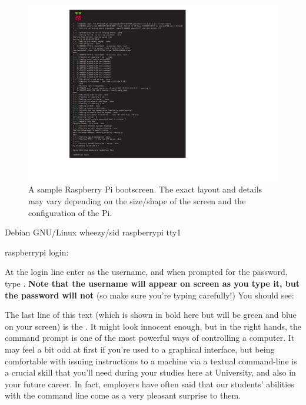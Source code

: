 \begin{figure}
\centerline{\includegraphics[width=15cm]{images/bootscreen}}
\caption{A sample Raspberry Pi bootscreen. The exact layout and details may vary depending on the size/shape of the screen and the configuration of the Pi.}\label{figure:piboot}
\end{figure}

\begin{ttoutenv}
Debian GNU/Linux wheezy/sid raspberrypi tty1

raspberrypi login:
\end{ttoutenv}

At the login line enter  as the username, and when prompted for the password, type . \textbf{Note that the username will appear on screen as you type it, but the password will not} (so make sure you're typing carefully!) You should see:



%

The last line of this text (which is shown in bold here but will be green and blue on your screen) is the . It might look innocent enough, but in the right hands, the command prompt is one of the most powerful ways of controlling a computer. It may feel a bit odd at first if you're used to a graphical interface, but being comfortable with issuing instructions to a machine via a textual command-line is a crucial skill that you'll need during your studies here at University, and also in your future career. In fact, employers have often said that our students' abilities with the command line come as a very pleasant surprise to them.


